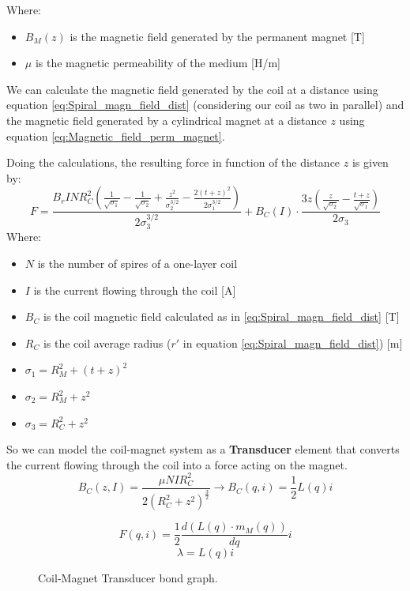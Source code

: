 Where:
\begin{itemize}
    \item $B_M(z)$ is the magnetic field generated by the permanent magnet [T]
    \item $\mu$ is the magnetic permeability of the medium [H/m]
\end{itemize}

We can calculate the magnetic field generated by the coil at a distance using equation \ref{eq:Spiral_magn_field_dist} (considering our coil as two in parallel) and the magnetic field generated by a cylindrical magnet at a distance $z$ using equation \ref{eq:Magnetic_field_perm_magnet}.

Doing the calculations, the resulting force in function of the distance $z$ is given by:
\begin{equation}
    F = \frac{ B_r I N R_C^2 \left(\frac{1}{\sqrt{\sigma_1}} - \frac{1}{\sqrt{\sigma_2}} + \frac{z^2}{\sigma_2^{3/2}} - \frac{2(t+z)^2}{2\sigma_1^{3/2}}\right)}{2\sigma_3^{3/2}} + B_C(I) \cdot \frac{3z \left(\frac{z}{\sqrt{\sigma_2}} - \frac{t+z}{\sqrt{\sigma_1}}\right)}{2\sigma_3}
\end{equation}
Where:
\begin{itemize}
    \item $N$ is the number of spires of a one-layer coil
    \item $I$ is the current flowing through the coil [A]
    \item $B_C$ is the coil magnetic field calculated as in \ref{eq:Spiral_magn_field_dist} [T]
    \item $R_C$ is the coil average radius ($r'$ in equation \ref{eq:Spiral_magn_field_dist}) [m]
    \item $\sigma_1 = R_M^2 + (t+z)^2$
    \item $\sigma_2 = R_M^2 + z^2$
    \item $\sigma_3 = R_C^2 + z^2$    
\end{itemize}

So we can model the coil-magnet system as a \textbf{Transducer} element that converts the current flowing through the coil into a force acting on the magnet.
\begin{equation}
    B_C(z, I) = \frac{\mu N I R_C^2}{2(R_C^2+z^2)^\frac{3}{2}} \rightarrow B_C(q, i) = \frac{1}{2} L(q) i
\end{equation}

\begin{figure}
    \centering
    \resizebox{.9\linewidth}{!}{}
    \caption{Coil-Magnet Transducer bond graph.}
    \label{fig:Coil-Magnet Transducer}
    \begin{equation}
        F(q, i) = \frac{1}{2} \frac{d \left(L(q) \cdot m_M(q) \right)}{dq} i
    \end{equation}
    \begin{equation}
        \lambda = L(q) i
    \end{equation}
\end{figure}

